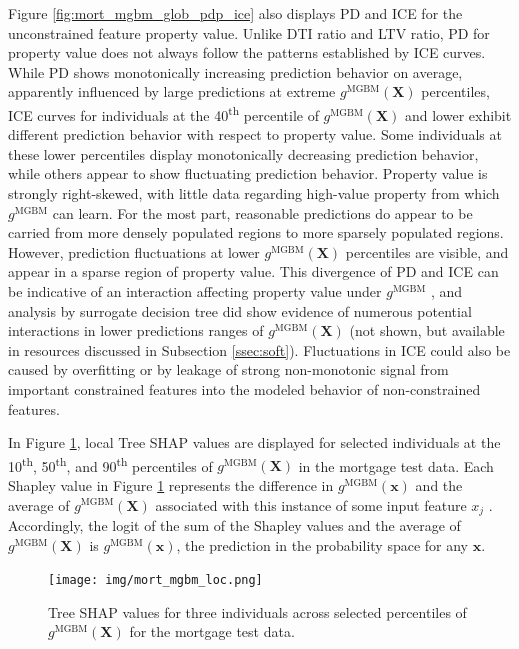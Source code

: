 \documentclass[information,article,submit,moreauthors,pdftex]{definitions/mdpi}
\begin{document}
Figure \ref{fig:mort_mgbm_glob_pdp_ice} also displays PD and ICE for the unconstrained feature property value. Unlike DTI ratio and LTV ratio, PD for property value does not always follow the patterns established by ICE curves. While PD shows monotonically increasing prediction behavior on average, apparently influenced by large predictions at extreme $g^{\text{MGBM}}(\mathbf{X})$ percentiles, ICE curves for individuals at the 40\textsuperscript{th} percentile of $g^{\text{MGBM}}(\mathbf{X})$ and lower exhibit different prediction behavior with respect to property value. Some individuals at these lower percentiles display monotonically decreasing prediction behavior, while others appear to show fluctuating prediction behavior. Property value is strongly right-skewed, with little data regarding high-value property from which $g^{\text{MGBM}}$ can learn. For the most part, reasonable predictions do appear to be carried from more densely populated regions to more sparsely populated regions. However, prediction fluctuations at lower $g^{\text{MGBM}}(\mathbf{X})$ percentiles are visible, and appear in a sparse region of property value. This divergence of PD and ICE can be indicative of an interaction affecting property value under $g^{\text{MGBM}}$ \cite{ice_plots}, and analysis by surrogate decision tree did show evidence of numerous potential interactions in lower predictions ranges of $g^{\text{MGBM}}(\mathbf{X})$ \cite{art_and_sci} (not shown, but available in resources discussed in Subsection \ref{ssec:soft}). Fluctuations in ICE could also be caused by overfitting or by leakage of strong non-monotonic signal from important constrained features into the modeled behavior of non-constrained features.

In Figure \ref{fig:mort_mgbm_loc}, local Tree SHAP values are displayed for selected individuals at the 10\textsuperscript{th}, 50\textsuperscript{th}, and 90\textsuperscript{th} percentiles of $g^{\text{MGBM}}(\mathbf{X})$ in the mortgage test data. Each Shapley value in Figure \ref{fig:mort_mgbm_loc} represents the difference in $g^\text{MGBM}(\mathbf{x})$ and the average of $g^\text{MGBM}(\mathbf{X})$ associated with this instance of some input feature $x_j$ \cite{molnar}. Accordingly, the logit of the sum of the Shapley values and the average of $g^\text{MGBM}(\mathbf{X})$ is $g^\text{MGBM}(\mathbf{x})$, the prediction in the probability space for any $\mathbf{x}$. 

\begin{figure}[htb]
\centering
\texttt{[image: img/mort\_mgbm\_loc.png]}
\caption{Tree SHAP values for three individuals across selected percentiles of $g^\text{MGBM}(\mathbf{X})$ for the mortgage test data.}
\label{fig:mort_mgbm_loc}
\end{figure}   
\end{document}
